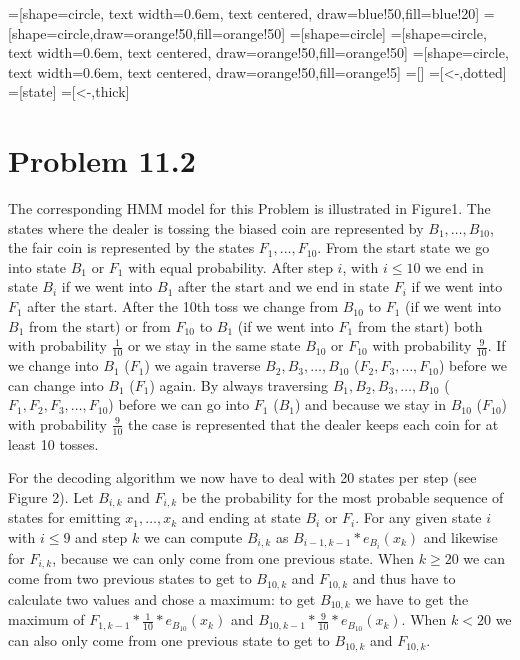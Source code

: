 \documentclass[a4paper]{article}
\begin{document}
 
=[shape=circle, text width=0.6em, text centered, draw=blue!50,fill=blue!20]
=[shape=circle,draw=orange!50,fill=orange!50]
=[shape=circle]
=[shape=circle, text width=0.6em, text centered, draw=orange!50,fill=orange!50]
=[shape=circle, text width=0.6em, text centered, draw=orange!50,fill=orange!5]
=[]
=[<-,dotted]
=[state]
=[<-,thick]

\section{Problem 11.2}

The corresponding HMM model for this Problem is illustrated in Figure1. The states where the dealer is tossing the biased coin are represented by $B_1,\hdots,B_{10}$, the fair coin is represented by the states $F_1,\hdots, F_{10}$. From the start state we go into state $B_1$ or $F_1$ with equal probability. After step $i$, with $i\leq10$ we end in state $B_i$ if we went into $B_1$ after the start and we end in state $F_i$ if we went into $F_1$ after the start. After the 10th toss we change from $B_{10}$ to $F_1$ (if we went into $B_1$ from the start) or from $F_{10}$ to $B_1$ (if we went into $F_1$ from the start) both with probability $\frac{1}{10}$ or we stay in the same state $B_{10}$ or $F_{10}$ with probability $\frac{9}{10}$.
If we change into $B_1$ ($F_1$) we again traverse $B_2, B_3, \hdots, B_{10}$ ($F_2, F_3, \hdots, F_{10}$) before we can change into $B_1$ ($F_1$) again. By always traversing $B_1, B_2, B_3, \hdots, B_{10}$ ($F_1,F_2, F_3, \hdots, F_{10}$) before we can go into $F_1$ ($B_1$) and because we stay in $B_{10}$ ($F_{10}$) with probability $\frac{9}{10}$ the case is represented that the dealer keeps each coin for at least 10 tosses.

For the decoding algorithm we now have to deal with 20 states per step (see Figure 2). Let $B_{i,k}$ and $F_{i,k}$ be the probability for the most probable sequence of states for emitting $x_1,\hdots, x_k$ and ending at state $B_i$ or $F_i$. For any given state $i$ with $i\leq9$ and step $k$ we can compute $B_{i,k}$ as $B_{i-1,k-1}*e_{B_i}(x_k)$ and likewise for $F_{i,k}$, because we can only come from one previous state. When $k\geq20$ we can come from two previous states to get to $B_{10,k}$ and $F_{10,k}$ and thus have to calculate two values and chose a maximum: to get  $B_{10,k}$ we have to get the maximum of  $F_{1,k-1}*\frac{1}{10}*e_{B_{10}}(x_k)$ and $B_{10,k-1}*\frac{9}{10}*e_{B_{10}}(x_k)$. When $k<20$ we can also only come from one previous state to get to $B_{10,k}$ and $F_{10,k}$. 
\end{document}
